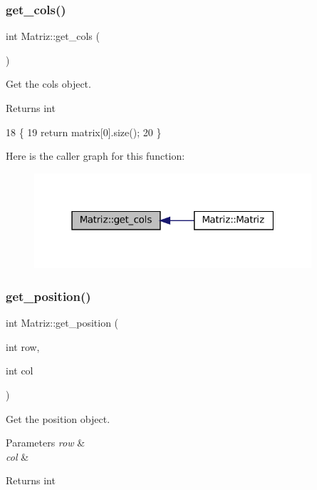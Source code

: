 \subsubsection{\texorpdfstring{get\+\_\+cols()}{get\_cols()}}
{\footnotesize\ttfamily int Matriz\+::get\+\_\+cols (\begin{DoxyParamCaption}{ }\end{DoxyParamCaption})}



Get the cols object. 

\begin{DoxyReturn}{Returns}
int 
\end{DoxyReturn}

\begin{DoxyCode}
18 \{
19   \textcolor{keywordflow}{return} matrix[0].size();
20 \}
\end{DoxyCode}
Here is the caller graph for this function\+:\nopagebreak
\begin{figure}[H]
\begin{center}
\leavevmode
\includegraphics[width=292pt]{classMatriz_ad6915f9b31f93230a3ce05d01d23a47b_icgraph}
\end{center}
\end{figure}
\mbox{\label{classMatriz_a1894d8447d3ae6992a43e46f93422b88}} 
\subsubsection{\texorpdfstring{get\+\_\+position()}{get\_position()}}
{\footnotesize\ttfamily int Matriz\+::get\+\_\+position (\begin{DoxyParamCaption}\item[{int}]{row,  }\item[{int}]{col }\end{DoxyParamCaption})}



Get the position object. 


\begin{DoxyParams}{Parameters}
{\em row} & \\
\hline
{\em col} & \\
\hline
\end{DoxyParams}
\begin{DoxyReturn}{Returns}
int 
\end{DoxyReturn}

